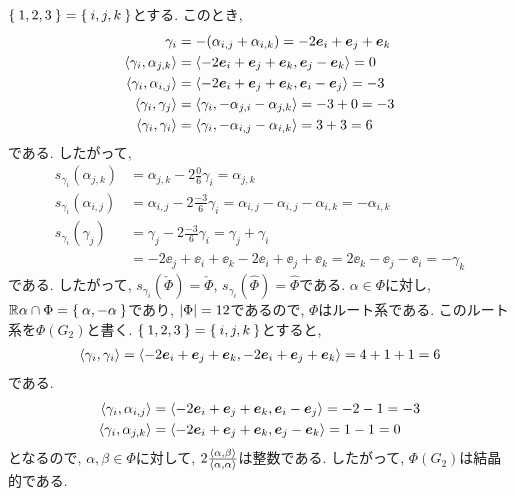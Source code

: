 $\Set{1,2,3}=\Set{i,j,k}$とする.
このとき,
\begin{align*}
  \gamma_{i}&=-(\alpha_{i,j}+\alpha_{i,k})=-2\boldsymbol{e}_i+\boldsymbol{e}_j+\boldsymbol{e}_k\\
  \Braket{\gamma_{i},\alpha_{j,k}}
  &=\Braket{-2\boldsymbol{e}_i+\boldsymbol{e}_j+\boldsymbol{e}_k,\boldsymbol{e}_j-\boldsymbol{e}_k}=0\\
  \Braket{\gamma_{i},\alpha_{i,j}}
  &=\Braket{-2\boldsymbol{e}_i+\boldsymbol{e}_j+\boldsymbol{e}_k,\boldsymbol{e}_i-\boldsymbol{e}_j}=-3\\
  \Braket{\gamma_{i},\gamma_{j}}
  &=\Braket{\gamma_i,-\alpha_{j,i}-\alpha_{j,k}}=-3+0=-3\\
  \Braket{\gamma_{i},\gamma_{i}}
  &=\Braket{\gamma_i,-\alpha_{i,j}-\alpha_{i,k}}=3+3=6
\end{align*}
である. したがって,
\begin{align*}
  s_{\gamma_{i}}(\alpha_{j,k})&=\alpha_{j,k}-2\frac{0}{6}\gamma_i
  =\alpha_{j,k}\\
  s_{\gamma_{i}}(\alpha_{i,j})&=\alpha_{i,j}-2\frac{-3}{6}\gamma_i
  =\alpha_{i,j}-\alpha_{i,j}-\alpha_{i,k}=-\alpha_{i,k}\\
  s_{\gamma_{i}}(\gamma_{j})&=\gamma_{j}-2\frac{-3}{6}\gamma_i
  =\gamma_j+\gamma_i\\
  &=-2\ee_j+\ee_i+\ee_k-2\ee_i+\ee_j+\ee_k
  =2\ee_k-\ee_j-\ee_i=-\gamma_k
\end{align*}
である.
したがって,
$s_{\gamma_i}(\check\Phi)=\check\Phi$,
$s_{\gamma_i}(\hat\Phi)=\hat\Phi$である.
$\alpha\in\Phi$に対し, $\mathbb{R}\alpha\cap\Phi=\Set{\alpha,-\alpha}$であり,
$\left|\Phi\right|=12$であるので, $\Phi$はルート系である.
このルート系を$\Phi(G_2)$と書く.
$\Set{1,2,3}=\Set{i,j,k}$とすると,
\begin{align*}
  \Braket{\gamma_{i},\gamma_{i}}=\Braket{-2\boldsymbol{e}_i+\boldsymbol{e}_j+\boldsymbol{e}_k,-2\boldsymbol{e}_i+\boldsymbol{e}_j+\boldsymbol{e}_k}=4+1+1=6
\end{align*}
である.
\begin{align*}
  \Braket{\gamma_{i},\alpha_{i,j}}&=\Braket{-2\boldsymbol{e}_i+\boldsymbol{e}_j+\boldsymbol{e}_k,\boldsymbol{e}_i-\boldsymbol{e}_j}=-2-1=-3\\
  \Braket{\gamma_{i},\alpha_{j,k}}&=\Braket{-2\boldsymbol{e}_i+\boldsymbol{e}_j+\boldsymbol{e}_k,\boldsymbol{e}_j-\boldsymbol{e}_k}=1-1=0
\end{align*}
となるので,
$\alpha,\beta\in\Phi$に対して,
$2\frac{\Braket{\alpha,\beta}}{\Braket{\alpha,\alpha}}$は整数である.
したがって,
$\Phi(G_{2})$は結晶的である.

